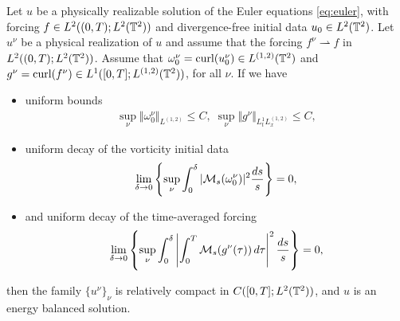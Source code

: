 \documentclass[reqno,12pt]{amsart}
\DeclareMathOperator{\curl}{curl}
\begin{document}

\begin{theorem}
  \label{thm:L12}
  Let $u$ be a physically realizable solution of the Euler equations \eqref{eq:euler}, with forcing $f\in L^2((0,T);L^2(\mathbb{T}^2))$ and divergence-free initial data $u_0 \in L^2(\mathbb{T}^2)$. Let $u^\nu$ be a physical realization of $u$ and assume that the forcing $f^\nu \rightharpoonup f$ in $L^2((0,T);L^2(\mathbb{T}^2))$. Assume that $\omega_0^\nu = \curl(u^\nu_0)\in L^{(1,2)}(\T^2)$ and $g^\nu = \curl(f^\nu) \in L^1([0,T];L^{(1,2)}(\T^2))$, for all $\nu$. If we have
\begin{itemize}
\item uniform bounds
  \begin{align}
    \label{eq:L12-1}
    \sup_{\nu} \Vert \omega_0^\nu \Vert_{L^{(1,2)}}\le C, \;  \sup_{\nu} \Vert g^\nu \Vert_{L^1_tL^{(1,2)}_x} \le C,
  \end{align}
\item uniform decay of the vorticity initial data
  \begin{align}
    \label{eq:L12-2}
    \lim_{\delta \to 0}
    \left\{
    \sup_{\nu}
    \int_0^\delta |\mathcal{M}_s(\omega_0^\nu)|^2\frac{ds}{s}
    \right\}
    =
    0,
  \end{align}
\item and uniform decay of the time-averaged forcing
  \begin{align}
    \label{eq:L12-3}
    \lim_{\delta \to 0}
    \left\{\sup_\nu
    \int_0^\delta \left|\int_0^T \mathcal{M}_s(g^\nu(\tau)) \, d\tau \right|^2 \frac{ds}{s}
    \right\}
    =
    0,
  \end{align}
\end{itemize}
then the family $\{u^\nu\}_{\nu}$ is relatively compact in $C([0,T];L^2(\mathbb{T}^2))$, and $u$ is an energy balanced solution.
\end{theorem}
\end{document}
